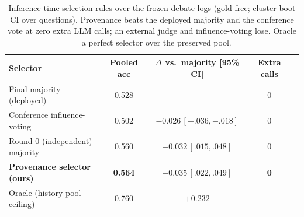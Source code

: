 \begin{table}[t]
\centering\small
\caption{Inference-time selection rules over the frozen debate logs (gold-free; cluster-boot CI over
questions). Provenance beats the deployed majority and the conference vote at zero extra LLM calls;
an external judge and influence-voting lose. Oracle = a perfect selector over the preserved pool.}
\label{tab:selector}
\begin{tabular}{lcccl}
\toprule
Selector & Pooled acc & $\Delta$ vs.\ majority [95\% CI] & Extra calls \\
\midrule
Final majority (deployed)          & 0.528 & --- & 0 \\
Conference influence-voting        & 0.502 & $-0.026\,[-.036,-.018]$ & 0 \\
Round-0 (independent) majority     & 0.560 & $+0.032\,[.015,.048]$ & 0 \\
\textbf{Provenance selector (ours)}& \textbf{0.564} & $\mathbf{+0.035\,[.022,.049]}$ & \textbf{0} \\
\midrule
Oracle (history-pool ceiling)      & 0.760 & $+0.232$ & --- \\
\bottomrule
\end{tabular}
\end{table}

